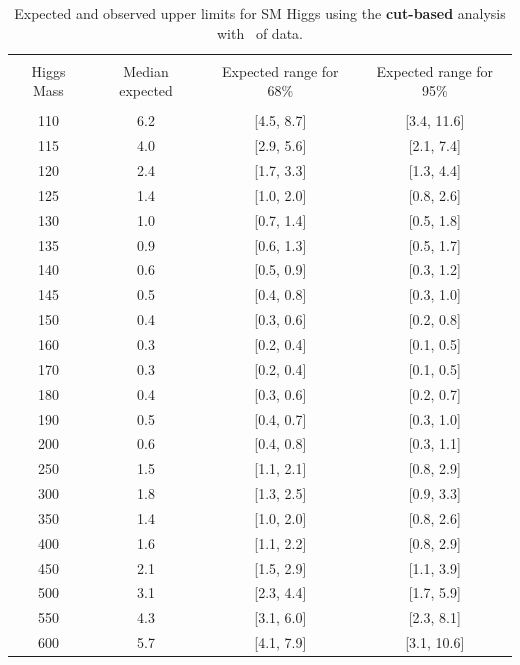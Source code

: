 \begin{table}[hbp!]
\begin{center}
\begin{tabular}{c c c c}
\hline
\vspace{-3mm} && \\
 Higgs Mass   & Median expected & Expected range for 68\% & Expected range for 95\%   \\
\vspace{-3mm} && \\
\hline
110 & 6.2 & [4.5, 8.7] & [3.4, 11.6] \\
115 & 4.0 & [2.9, 5.6] & [2.1, 7.4] \\
120 & 2.4 & [1.7, 3.3] & [1.3, 4.4] \\
125 & 1.4 & [1.0, 2.0] & [0.8, 2.6] \\
130 & 1.0 & [0.7, 1.4] & [0.5, 1.8] \\
135 & 0.9 & [0.6, 1.3] & [0.5, 1.7] \\
140 & 0.6 & [0.5, 0.9] & [0.3, 1.2] \\
145 & 0.5 & [0.4, 0.8] & [0.3, 1.0] \\
150 & 0.4 & [0.3, 0.6] & [0.2, 0.8] \\
160 & 0.3 & [0.2, 0.4] & [0.1, 0.5] \\
170 & 0.3 & [0.2, 0.4] & [0.1, 0.5] \\
180 & 0.4 & [0.3, 0.6] & [0.2, 0.7] \\
190 & 0.5 & [0.4, 0.7] & [0.3, 1.0] \\
200 & 0.6 & [0.4, 0.8] & [0.3, 1.1] \\
250 & 1.5 & [1.1, 2.1] & [0.8, 2.9] \\
300 & 1.8 & [1.3, 2.5] & [0.9, 3.3] \\
350 & 1.4 & [1.0, 2.0] & [0.8, 2.6] \\
400 & 1.6 & [1.1, 2.2] & [0.8, 2.9] \\
450 & 2.1 & [1.5, 2.9] & [1.1, 3.9] \\
500 & 3.1 & [2.3, 4.4] & [1.7, 5.9] \\
550 & 4.3 & [3.1, 6.0] & [2.3, 8.1] \\
600 & 5.7 & [4.1, 7.9] & [3.1, 10.6] \\
\hline
\end{tabular}
\caption{Expected and observed upper limits for SM Higgs using the
  {\bf cut-based} analysis with \intlumiEightTeV\ of data.}
\label{tab:cutbase_uls}
\end{center}
\end{table}

